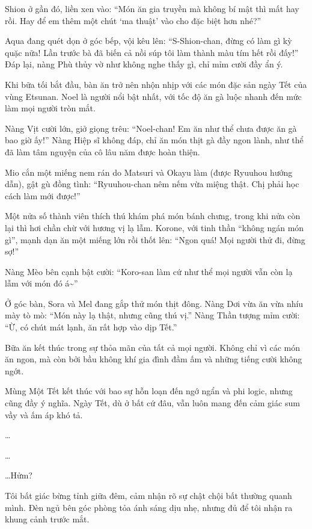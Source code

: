 \documentclass[../main.tex]{subfiles}
\begin{document}
Shion ở gần đó, liền xen vào: ``Món ăn gia truyền mà không bí mật thì mất hay rồi. Hay để em thêm một chút `ma thuật' vào cho đặc biệt hơn nhé?''

Aqua đang quét dọn ở góc bếp, vội kêu lên: ``S-Shion-chan, đừng có làm gì kỳ quặc nữa! Lần trước bà đã biến cả nồi súp tôi làm thành màu tím hết rồi đấy!'' Đáp lại, nàng Phù thủy vờ như không nghe thấy gì, chỉ mỉm cười đầy ẩn ý.

\ct

Khi bữa tối bắt đầu, bàn ăn trở nên nhộn nhịp với các món đặc sản ngày Tết của vùng Etsunan. Noel là người nổi bật nhất, với tốc độ ăn gà luộc nhanh đến mức làm mọi người tròn mắt.

Nàng Vịt cười lớn, giở giọng trêu: ``Noel-chan! Em ăn như thể chưa được ăn gà bao giờ ấy!'' Nàng Hiệp sĩ không đáp, chỉ ăn món thịt gà đầy ngon lành, như thể đã làm tâm nguyện của cô lâu năm được hoàn thiện.

Mio cắn một miếng nem rán do Matsuri và Okayu làm (được Ryuuhou hướng dẫn), gật gù đồng tình: ``Ryuuhou-chan nêm nếm vừa miệng thật. Chị phải học cách làm mới được!''

Một nửa số thành viên thích thú khám phá món bánh chưng, trong khi nửa còn lại thì hơi chần chừ với hương vị lạ lẫm. Korone, với tinh thần ``không ngán món gì'', mạnh dạn ăn một miếng lớn rồi thốt lên: ``Ngon quá! Mọi người thử đi, đừng sợ!''

Nàng Mèo bên cạnh bật cười: ``Koro-san làm cứ như thể mọi người vẫn còn lạ lẫm với món đó á\~{}''

Ở góc bàn, Sora và Mel đang gắp thử món thịt đông. Nàng Dơi vừa ăn vừa nhíu mày tò mò: ``Món này lạ thật, nhưng cũng thú vị.'' Nàng Thần tượng mỉm cười: ``Ừ, có chút mát lạnh, ăn rất hợp vào dịp Tết.''

Bữa ăn kết thúc trong sự thỏa mãn của tất cả mọi người. Không chỉ vì các món ăn ngon, mà còn bởi bầu không khí gia đình đầm ấm và những tiếng cười không ngớt.

Mùng Một Tết kết thúc với bao sự hỗn loạn đến ngớ ngẩn và phi logic, nhưng cũng đầy ý nghĩa. Ngày Tết, dù ở bất cứ đâu, vẫn luôn mang đến cảm giác sum vầy và ấm áp khó tả.

\ct


\dots

\dots

\dots Hửm?

Tôi bất giác bừng tỉnh giữa đêm, cảm nhận rõ sự chật chội bất thường quanh mình. Đèn ngủ bên góc phòng tỏa ánh sáng dịu nhẹ, nhưng đủ để tôi nhận ra khung cảnh trước mắt.
\end{document}
